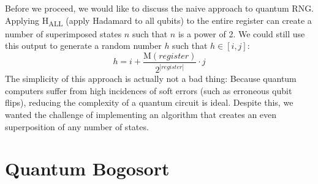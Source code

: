 \documentclass[12pt]{article}
\begin{document}
\begin{enumerate}
Before we proceed, we would like to discuss the naive approach to quantum RNG. Applying H\textsubscript{ALL} (apply Hadamard to all qubits) to the entire register can create a number of superimposed states $ n $ such that $ n $ is a power of 2. We could still use this output to generate a random number $ h $ such that $ h \in [i, j] $:
$$ h = i + \frac{\text{M}(register)}{2^{|register|}} \cdot j $$
The simplicity of this approach is actually not a bad thing: Because quantum computers suffer from high incidences of soft errors (such as erroneous qubit flips), reducing the complexity of a quantum circuit is ideal. Despite this, we wanted the challenge of implementing an algorithm that creates an even superposition of any number of states.
\end{enumerate}
 
\section{Quantum Bogosort}
\end{document}
